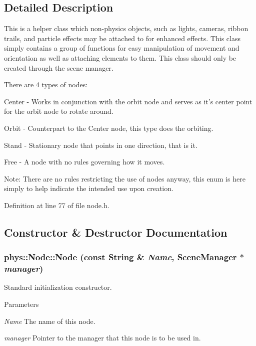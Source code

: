 \subsection{Detailed Description}
This is a helper class which non-\/physics objects, such as lights, cameras, ribbon trails, and particle effects may be attached to for enhanced effects. This class simply contains a group of functions for easy manipulation of movement and orientation as well as attaching elements to them. This class should only be created through the scene manager. \par
 There are 4 types of nodes: \par
 Center -\/ Works in conjunction with the orbit node and serves as it's center point for the orbit node to rotate around. \par
 Orbit -\/ Counterpart to the Center node, this type does the orbiting. \par
 Stand -\/ Stationary node that points in one direction, that is it. \par
 Free -\/ A node with no rules governing how it moves. \par
 Note: There are no rules restricting the use of nodes anyway, this enum is here simply to help indicate the intended use upon creation. 

Definition at line 77 of file node.h.



\subsection{Constructor \& Destructor Documentation}
\hypertarget{classphys_1_1Node_a09393f483ab4bb2fdb74b26a59ffd37e}{
\subsubsection[{Node}]{\setlength{\rightskip}{0pt plus 5cm}phys::Node::Node (const {\bf String} \& {\em Name}, \/  {\bf SceneManager} $\ast$ {\em manager})}}
\label{d0/ddc/classphys_1_1Node_a09393f483ab4bb2fdb74b26a59ffd37e}


Standard initialization constructor. 


\begin{DoxyParams}{Parameters}
\item[{\em Name}]The name of this node. \item[{\em manager}]Pointer to the manager that this node is to be used in. \end{DoxyParams}


